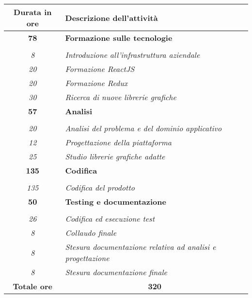 

\begin{tabularx}{\textwidth}{|c|X|}
	\hline
	\textbf{Durata in ore} & \textbf{Descrizione dell'attività} \\\hline

	\textbf{78} & \textbf{Formazione sulle tecnologie} \\ \hdashline
	\multirow{3}{0cm}\\
	\textit{8} &
	\textit{Introduzione all'infrastruttura aziendale} \\
	\textit{20} &
	\textit{Formazione ReactJS} \\
	\textit{20} &
	\textit{Formazione Redux} \\
	\textit{30} &
	\textit{Ricerca di nuove librerie grafiche} \\
	\hline

    \textbf{57} & \textbf{Analisi} \\ \hdashline
    \multirow{3}{0cm}\\
    \textit{20} &
    \textit{Analisi del problema e del dominio applicativo} \\
    \textit{12} &
    \textit{Progettazione della piattaforma} \\
    \textit{25} &
    \textit{Studio librerie grafiche adatte} \\
    \hline

		\textbf{135} & \textbf{Codifica} \\ \hdashline
		\multirow{3}{0cm}\\
		\textit{135} &
		\textit{Codifica del prodotto} \\
		\hline

		\textbf{50} & \textbf{Testing e documentazione} \\ \hdashline
		\multirow{3}{0cm}\\
		\textit{26} &
		\textit{Codifica ed esecuzione test} \\
		\textit{8} &
		\textit{Collaudo finale} \\
		\textit{8} &
		\textit{Stesura documentazione relativa ad analisi e progettazione} \\
		\textit{8} &
		\textit{Stesura documentazione finale} \\
		\hline

	\textbf{Totale ore} & \multicolumn{1}{|c|}{\textbf{320}} \\\hline


\end{tabularx}
